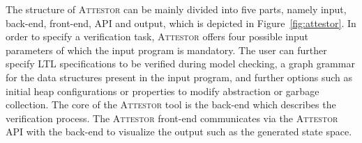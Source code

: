 \documentclass[a4paper, 12pt, twoside]{report}
\begin{document}
	The structure of \textsc{Attestor} can be mainly divided into five parts, namely input, back-end, front-end, API and output, which is depicted in Figure~\ref{fig:attestor}. In order to specify a verification task, \textsc{Attestor} offers four possible input parameters of which the input program is mandatory. The user can further specify LTL specifications to be verified during model checking, a graph grammar for the data structures present in the input program, and further options such as initial heap configurations or properties to modify abstraction or garbage collection. The core of the \textsc{Attestor} tool is the back-end which describes the verification process. The \textsc{Attestor} front-end communicates via the \textsc{Attestor} API with the back-end to visualize the output such as the generated state space.\\	
	
\end{document}
